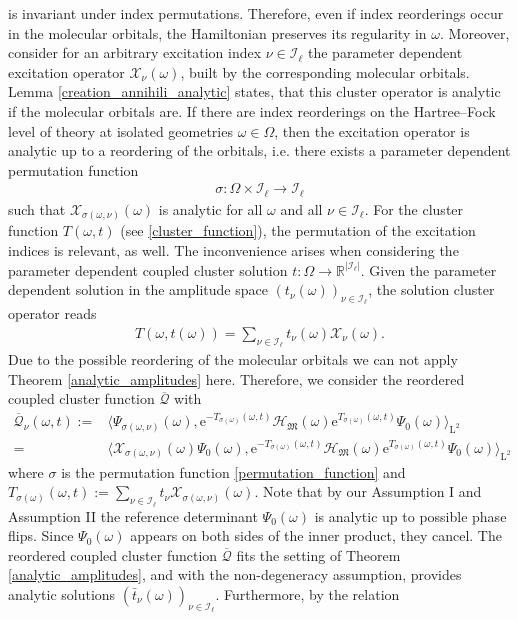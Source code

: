 \documentclass[reqno]{amsart}
\begin{document}
 is invariant under index permutations. Therefore, even if index reorderings occur in the molecular orbitals, the Hamiltonian preserves its regularity in $\omega$. Moreover, consider for an arbitrary excitation index $\nu\in \mathscr{I}_\ell$ the parameter dependent excitation operator $\mathscr{X}_\nu(\omega)$, built by the corresponding molecular orbitals. Lemma \ref{creation_annihili_analytic} states, that this cluster operator is analytic if the molecular orbitals are. If there are index reorderings on the Hartree–Fock level of theory at isolated geometries $\omega \in \Omega$, then the excitation operator is analytic up to a reordering of the orbitals, i.e. there exists a parameter dependent permutation function \begin{align}\label{permutation_function}
\sigma:\Omega\times\mathscr{I}_\ell\longrightarrow \mathscr{I}_\ell
 \end{align} such that $\mathscr{X}_{\sigma(\omega,\nu)}(\omega)$ is analytic for all $\omega$ and all $\nu\in\mathscr{I}_{\ell}$. For the cluster function $T(\omega,t)$ (see  \eqref{cluster_function}), the permutation of the excitation indices is relevant, as well. The inconvenience arises when considering the parameter dependent coupled cluster solution $t:\Omega\longrightarrow \mathbb{R}^{|\mathscr{I}_\ell|}$. Given the parameter dependent solution in the amplitude space $(t_\nu(\omega))_{\nu\in\mathscr{I}_\ell}$, the solution cluster operator reads
 \begin{align}\label{solution_cluster_op_param}
     T(\omega,t(\omega))=\sum_{\nu \in \mathscr{I}_\ell} t_\nu(\omega)\mathscr{X}_\nu(\omega).
 \end{align}Due to the possible reordering of the molecular orbitals we can not apply Theorem \ref{analytic_amplitudes} here. Therefore, we consider the reordered coupled cluster function $\overline{\mathcal{Q}}$ with \begin{align}
     \overline{\mathcal{Q}}_{\nu}(\omega,t):=& \langle \Psi_{\sigma(\omega,\nu)}(\omega), \mathrm{e}^{-T_{\sigma(\omega)}(\omega,t)}\mathcal{H}_\mathfrak{M}(\omega)\mathrm{e}^{T_{\sigma(\omega)}(\omega,t)}\Psi_0(\omega)\rangle_{\mathrm{L}^2}\\
     =&\langle \mathscr{X}_{\sigma(\omega,\nu)}(\omega)\Psi_0(\omega), \mathrm{e}^{-T_{\sigma(\omega)}(\omega,t)}\mathcal{H}_\mathfrak{M}(\omega)\mathrm{e}^{T_{\sigma(\omega)}(\omega,t)}\Psi_0(\omega)\rangle_{\mathrm{L}^2}
 \end{align}
 where $\sigma$ is the permutation function \eqref{permutation_function} and $T_{\sigma(\omega)}(\omega,t):=\sum_{\nu \in \mathscr{I}_\ell} t_\nu\mathscr{X}_{\sigma(\omega, \nu)}(\omega)$. Note that by our  Assumption I and Assumption II the reference determinant $\Psi_0(\omega)$ is analytic up to possible phase flips. Since $\Psi_0(\omega)$ appears on both sides of the inner product, they cancel. The reordered coupled cluster function $\overline{\mathcal{Q}}$ fits the setting of Theorem \ref{analytic_amplitudes}, and with the non-degeneracy assumption, provides analytic solutions $(\bar{t}_\nu(\omega))_{\nu\in \mathscr{I}_\ell}$. Furthermore, by the relation
\end{document}
